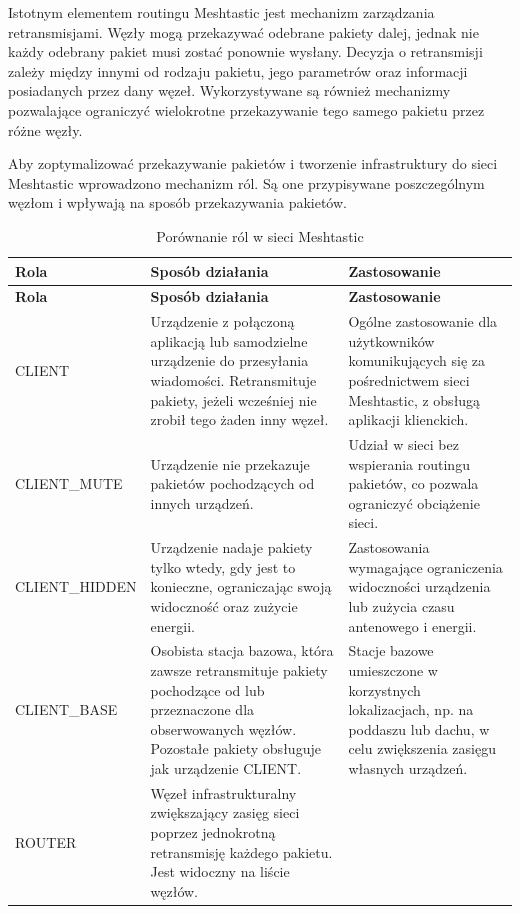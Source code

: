 \documentclass[12pt,a4paper,twoside]{report}
\theoremstyle{definition} %
\begin{document}
    Istotnym elementem routingu Meshtastic jest mechanizm zarządzania retransmisjami. Węzły mogą przekazywać odebrane pakiety dalej, jednak nie każdy odebrany pakiet musi zostać ponownie wysłany. Decyzja o retransmisji zależy między innymi od rodzaju pakietu, jego parametrów oraz informacji posiadanych przez dany węzeł. Wykorzystywane są również mechanizmy pozwalające ograniczyć wielokrotne przekazywanie tego samego pakietu przez różne węzły.
    
    Aby zoptymalizować przekazywanie pakietów i tworzenie infrastruktury do sieci Meshtastic wprowadzono mechanizm ról. Są one przypisywane poszczególnym węzłom i wpływają na sposób przekazywania pakietów.
\begin{longtable}{|p{3.6cm}|p{5.2cm}|p{5.2cm}|}
\caption{Porównanie ról w sieci Meshtastic \cite{meshtastic_device}}
    \label{tabela1}\\
    \hline
    \textbf{Rola} & \textbf{Sposób działania} & \textbf{Zastosowanie} \\
    \hline
    \endfirsthead
    \hline
    \textbf{Rola} & \textbf{Sposób działania} & \textbf{Zastosowanie} \\
    \hline
    \endhead
    CLIENT &
    Urządzenie z połączoną aplikacją lub samodzielne urządzenie do przesyłania wiadomości. Retransmituje pakiety, jeżeli wcześniej nie zrobił tego żaden inny węzeł. &
    Ogólne zastosowanie dla użytkowników komunikujących się za pośrednictwem sieci Meshtastic, z obsługą aplikacji klienckich. \\
    \hline
    CLIENT\_MUTE &
    Urządzenie nie przekazuje pakietów pochodzących od innych urządzeń. &
    Udział w sieci bez wspierania routingu pakietów, co pozwala ograniczyć obciążenie sieci. \\
    \hline
    CLIENT\_HIDDEN &
    Urządzenie nadaje pakiety tylko wtedy, gdy jest to konieczne, ograniczając swoją widoczność oraz zużycie energii. &
    Zastosowania wymagające ograniczenia widoczności urządzenia lub zużycia czasu antenowego i energii. \\
    \hline
    CLIENT\_BASE &
    Osobista stacja bazowa, która zawsze retransmituje pakiety pochodzące od lub przeznaczone dla obserwowanych węzłów. Pozostałe pakiety obsługuje jak urządzenie CLIENT. &
    Stacje bazowe umieszczone w korzystnych lokalizacjach, np. na poddaszu lub dachu, w celu zwiększenia zasięgu własnych urządzeń. \\
    \hline
    ROUTER &
    Węzeł infrastrukturalny zwiększający zasięg sieci poprzez jednokrotną retransmisję każdego pakietu. Jest widoczny na liście węzłów. &

\end{longtable}
\end{document}
